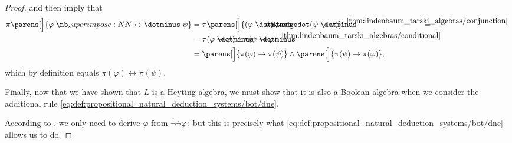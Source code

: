 \begin{proof}
   and  then imply that
  \begin{align*}
    \pi\parens[\Big]{ \varphi \syniff \psi }
    &=
    \pi\parens[\Big]{ (\varphi \synimplies \psi) \synwedge (\psi \synimplies \varphi) }
    \reloset {\ref{thm:lindenbaum_tarski_algebras/conjunction}} = \\ &=
    \pi(\varphi \synimplies \psi) \wedge \pi(\psi \synimplies \varphi)
    \reloset {\ref{thm:lindenbaum_tarski_algebras/conditional}} = \\ &=
    \parens[\Big]{ \pi(\varphi) \rightarrow \pi(\psi) } \wedge \parens[\Big]{ \pi(\psi) \rightarrow \pi(\varphi) },
  \end{align*}
  which by definition equals \( \pi(\varphi) \leftrightarrow \pi(\psi) \).

   Finally, now that we have shown that \( L \) is a Heyting algebra, we must show that it is also a Boolean algebra when we consider the additional rule \ref{eq:def:propositional_natural_deduction_systems/bot/dne}.

  According to , we only need to derive \( \varphi \) from \( \dot\neg \dot\neg \varphi \); but this is precisely what \ref{eq:def:propositional_natural_deduction_systems/bot/dne} allows us to do.
\end{proof}

